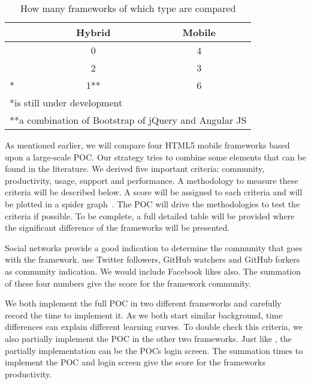 \documentclass[a4paper]{artikel3}
\renewcommand{\paragraph}[1]{\vspace{2mm} \noindent {\bf #1}  }
\begin{document}
\begin{table}[h!]
\centering
\begin{tabular}{lcc}
  & \textbf{Hybrid} & \textbf{Mobile}\\
  \hline \hline
\cite{Sarrafi2012a} & 0 & 4\\
\cite{Rozynski2011} & 2 & 3\\
\cite{Ayuso2012}* & 1** & 6\\
\hline
\multicolumn{3}{l}{*is still under development} \\
\multicolumn{3}{l}{**a combination of Bootstrap of jQuery and Angular JS} \\
\end{tabular}
\caption{How many frameworks of which type are compared}
\label{table:references_frameworks}
\end{table}

As mentioned earlier,  we will compare four HTML5 mobile frameworks based upon a large-scale POC.  Our strategy tries to combine some elements that can be found in the literature.  We derived five important criteria:  community,  productivity,  usage,  support and performance.  A methodology to measure these criteria will be described below.  A score will be assigned to each criteria and will be plotted in a spider graph~\cite{Few2005}.   The POC will drive the methodologies to test the criteria if possible.  To be complete,  a full detailed table will be provided where the significant difference of the frameworks will be presented. 	


\paragraph{Community}%
Social networks provide a good indication to determine the community that goes with the framework.  \cite{Sarrafi2012a,Ayuso2012} use Twitter followers,  GitHub watchers and GitHub forkers as community indication.  We would include Facebook likes also.  The summation of these four numbers give the score for the framework community.  


\paragraph{Productivity}%
We both implement the full POC in two different frameworks and carefully record the time to implement it.  As we both start similar background,  time differences can explain different learning curves.  To double check this criteria,  we also partially implement the POC in the other two frameworks.  Just like \cite{Burris},  the partially implementation can be the POCs login screen.  
The summation times to implement the POC and login screen give the score for the frameworks productivity.  
\end{document}
